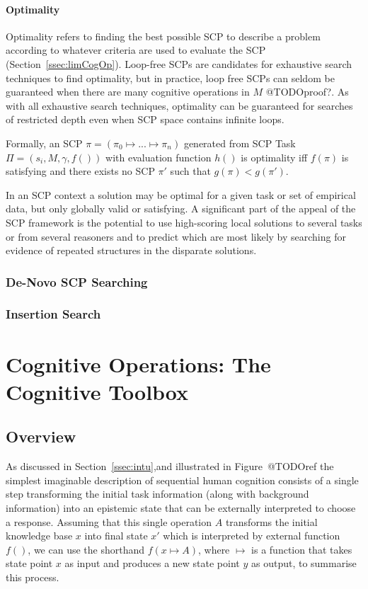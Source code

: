 \documentclass[
11pt, %
english, %
singlespacing, %
headsepline, %
]{MastersDoctoralThesis} %
\begin{document}
\subsubsection{Optimality}
Optimality refers to finding the best possible SCP to describe a problem according to whatever criteria are used to evaluate the SCP (Section~\ref{ssec:limCogOp}). Loop-free SCPs are candidates for exhaustive search techniques to find optimality, but in practice, loop free SCPs can seldom be guaranteed when there are many cognitive operations in $M$ @TODOproof?. As with all exhaustive search techniques, optimality can be guaranteed for searches of restricted depth even when SCP space contains infinite loops.

Formally, an SCP $\pi=(\pi_0 \longmapsto ... \longmapsto \pi_n)$ generated from SCP Task $\Pi=(s_i, M, \gamma, f())$ with evaluation function $h()$ is optimality iff $f(\pi)$ is satisfying and there exists no SCP $\pi'$ such that $g(\pi)<g(\pi')$.

In an SCP context a solution may be optimal for a given task or set of empirical data, but only globally valid or satisfying. A significant part of the appeal of the SCP framework is the potential to use high-scoring local solutions to several tasks or from several reasoners and to predict which are most likely by searching for evidence of repeated structures in the disparate solutions.

\subsection{De-Novo SCP Searching} \label{ssec:denovo}
\subsection{Insertion Search}\label{ssec:insertion}

\chapter{Cognitive Operations: The Cognitive Toolbox}
\section{Overview}
As discussed in Section~\ref{ssec:intu},and illustrated in Figure~@TODOref the simplest imaginable description of sequential human cognition consists of a single step transforming the initial task information (along with background information) into an epistemic state that can be externally interpreted to choose a response. Assuming that this single operation $A$ transforms the initial knowledge base $x$ into final state $x'$ which is interpreted by external function $f()$, we can use the shorthand $f(x \longmapsto A)$, where $\longmapsto$ is a function that takes state point $x$ as input and produces a new state point $y$ as output, to summarise this process. 
\end{document}
